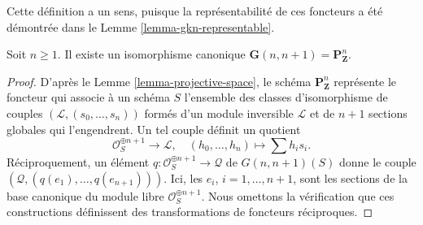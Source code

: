 \noindent
Cette définition a un sens, puisque la représentabilité de ces foncteurs a
été démontrée dans le Lemme \ref{lemma-gkn-representable}.

\begin{lemma}
\label{lemma-projective-space-grassmannian}
Soit $n \geq 1$. Il existe un isomorphisme canonique
$\mathbf{G}(n, n + 1) = \mathbf{P}^n_\mathbf{Z}$.
\end{lemma}

\begin{proof}
D'après le Lemme \ref{lemma-projective-space}, le schéma
$\mathbf{P}^n_\mathbf{Z}$ représente le foncteur qui associe à un schéma
$S$ l'ensemble des classes d'isomorphisme de couples
$(\mathcal{L}, (s_0, \ldots, s_n))$ formés d'un module inversible
$\mathcal{L}$ et de $n + 1$ sections globales qui l'engendrent.
Un tel couple définit un quotient
$$
\mathcal{O}_S^{\oplus n + 1} \longrightarrow \mathcal{L},\quad
(h_0, \ldots, h_n) \longmapsto \sum h_i s_i.
$$
Réciproquement, un élément
$q : \mathcal{O}_S^{\oplus n + 1} \to \mathcal{Q}$ de $G(n, n + 1)(S)$
donne le couple $(\mathcal{Q}, (q(e_1), \ldots, q(e_{n + 1})))$.
Ici, les $e_i$, $i = 1, \ldots, n + 1$, sont les sections de la base
canonique du module libre $\mathcal{O}_S^{\oplus n + 1}$.
Nous omettons la vérification que ces constructions définissent des
transformations de foncteurs réciproques.
\end{proof}








